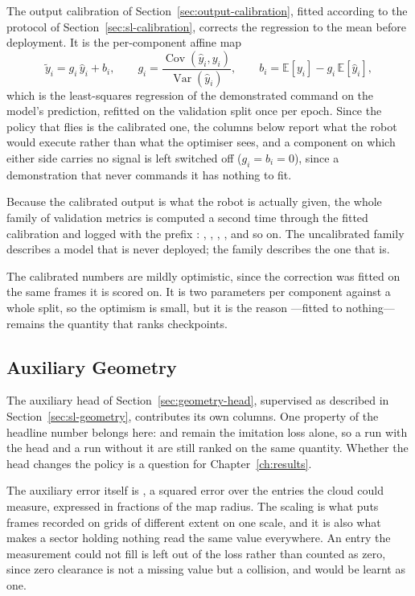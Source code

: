 The output calibration of Section~\ref{sec:output-calibration}, fitted
according to the protocol of Section~\ref{sec:sl-calibration}, corrects the
regression to the mean before deployment. It is the per-component affine map
%
\begin{equation}
  \tilde{y}_i = g_i\,\hat{y}_i + b_i,
  \qquad
  g_i = \frac{\operatorname{Cov}(\hat{y}_i, y_i)}{\operatorname{Var}(\hat{y}_i)},
  \qquad
  b_i = \mathbb{E}[y_i] - g_i\,\mathbb{E}[\hat{y}_i],
\end{equation}
%
which is the least-squares regression of the demonstrated command on the
model's prediction, refitted on the validation split once per epoch. Since the
policy that flies is the calibrated one, the columns below report what the robot
would execute rather than what the optimiser sees, and a component on
which either side carries no signal is left switched off ($g_i = b_i = 0$),
since a demonstration that never commands it has nothing to fit.

Because the calibrated output is what the robot is actually given, the whole
family of validation metrics is computed a second time through the fitted
calibration and logged with the prefix : ,
, ,
, and so on. The uncalibrated
 family describes a model that is never deployed; the
 family describes the one that is.

The calibrated numbers are mildly optimistic, since the correction was fitted
on the same frames it is scored on. It is two parameters per component
against a whole split, so the optimism is small, but it is the reason
---fitted to nothing---remains the quantity that ranks
checkpoints.

\subsection{Auxiliary Geometry}
\label{sec:metrics-geometry}

The auxiliary head of Section~\ref{sec:geometry-head}, supervised as described
in Section~\ref{sec:sl-geometry}, contributes its own columns. One property of
the headline number belongs here:  and  remain the
imitation loss alone, so a run with the head and a run without it are still
ranked on the same quantity. Whether the head changes the policy is a question
for Chapter~\ref{ch:results}.

The auxiliary error itself is , a squared error over the
entries the cloud could measure, expressed in fractions of the map radius.
The scaling is what puts frames recorded on grids of different extent on one
scale, and it is also what makes a sector holding nothing read the same value
everywhere. An entry the measurement could not fill is left out of the loss
rather than counted as zero, since zero clearance is not a missing value but a
collision, and would be learnt as one.


